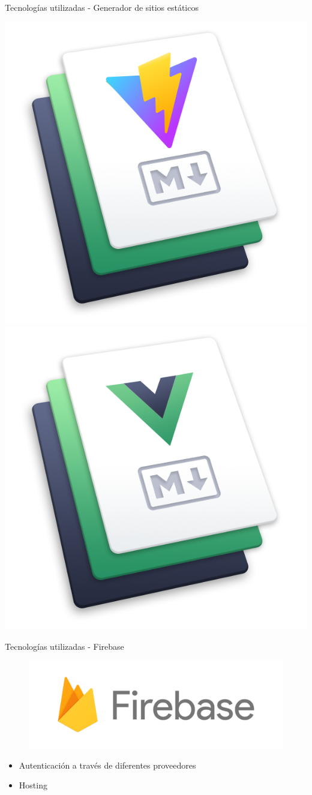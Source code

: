 \documentclass{beamer}
\begin{document}
        \begin{frame}{Tecnologías utilizadas - Generador de sitios estáticos}

            \begin{center}
                \includegraphics[width=.45\textwidth]{Presentacion/tecnologias/vitepress.png}
                \includegraphics[width=.45\textwidth]{Presentacion/tecnologias/vuepress.png}   
            \end{center}
            
        \end{frame}

        \begin{frame}{Tecnologías utilizadas - Firebase}
        
            \begin{center}
                \begin{figure}[htp]
                    \centering
                    \includegraphics[width=.7\textwidth]{Presentacion/tecnologias/firebase.png}\hfill
                    \label{fig:fir}
                \end{figure}  
    
                \begin{itemize}
                    \item Autenticación a través de diferentes proveedores
                    \item Hosting
                \end{itemize}
            \end{center}            
            
        \end{frame}
     
\end{document}

